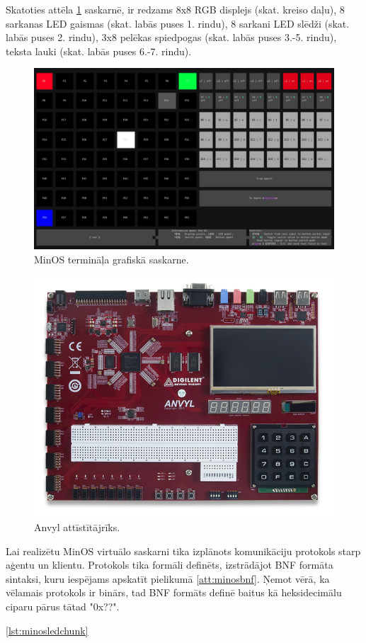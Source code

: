 Skatoties attēla \ref{fig:minosgui} saskarnē, ir redzams 8x8 RGB displejs (skat.
kreiso daļu), 8 sarkanas LED gaismas (skat. labās puses 1. rindu), 8 sarkani LED
slēdži (skat. labās puses 2. rindu), 3x8 pelēkas spiedpogas (skat. labās puses
3.-5. rindu), teksta lauki (skat. labās puses 6.-7. rindu). 

\begin{figure}[H]
    \includegraphics[width=0.7\linewidth]{assets/min-os-execution.png}
    \centering
    \caption{MinOS termināļa grafiskā saskarne.}
    \label{fig:minosgui}
\end{figure}

\begin{figure}[H]
    \includegraphics[width=0.7\linewidth]{assets/anvyl.png}
    \centering
    \caption{Anvyl attīstītājrīks.}
    \label{fig:anvyl}
\end{figure}

Lai realizētu MinOS virtuālo saskarni tika izplānots komunikāciju protokols
starp aģentu un klientu. Protokols tika formāli definēts, izstrādājot BNF
formāta sintaksi, kuru iespējams apskatīt pielikumā \ref{att:minosbnf}. Ņemot
vērā, ka vēlamais protokols ir binārs, tad BNF formāts definē baitus kā
heksidecimālu ciparu pārus tātad "0x??".

\ref{lst:minosledchunk}

